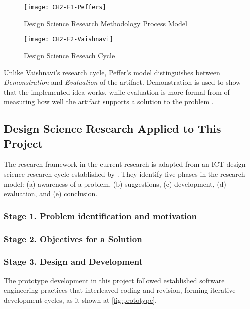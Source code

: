 \begin{figure}[h!]
\centering
\texttt{[image: CH2-F1-Peffers]}
\caption[Design Science Research Methodology Process Model]{Design Science
Research Methodology Process Model \citep{Peffers2008}}
\label{fig:peffers}
\end{figure}

\FloatBarrier

\begin{figure}[htp]
\centering
\texttt{[image: CH2-F2-Vaishnavi]}
\caption[Design Science Reseach Cycle]{Design Science Reseach Cycle \citep{Vaishnavi2007}}
\label{fig:vaishnavi}
\end{figure}

\FloatBarrier

Unlike Vaishnavi's research cycle, Peffer's model distinguishes between
\textit{Demonstration} and \textit{Evaluation} of the artifact. Demonstration is
used to show that the implemented idea works, while evaluation is more formal
from of measuring how well the artifact supports a solution to the problem
\citep{Peffers2008}.

\subsection{Design Science Research Applied to This Project}

The research framework in the current research is adapted from an ICT design
science research cycle established by \citet{Vaishnavi2007}. They identify five
phases in the research model: (a) awareness of a problem, (b) suggestions, (c)
development, (d) evaluation, and (e) conclusion.

\subsubsection{Stage 1. Problem identification and motivation}

\subsubsection{Stage 2. Objectives for a Solution}

\subsubsection{Stage 3. Design and Development}

The prototype development in this project followed established
software engineering practices that interleaved coding and revision, forming
iterative development cycles, as it shown at \ref{fig:prototype}.

